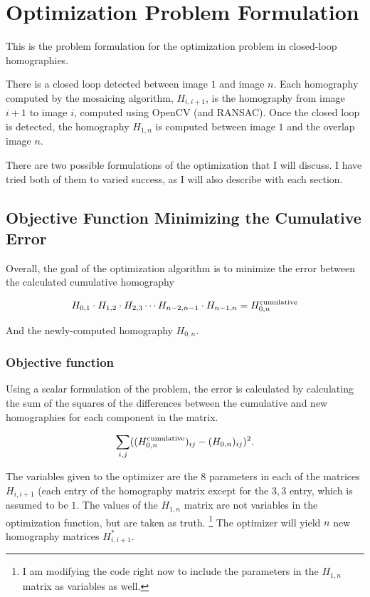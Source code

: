 \documentclass{article}
\begin{document}
\section{Optimization Problem Formulation}

This is the problem formulation for the optimization problem in closed-loop
homographies.

There is a closed loop detected between image $1$ and image $n$. Each
homography computed by the mosaicing algorithm, $H_{i, i + 1}$, is the
homography from image $i + 1$ to image $i$, computed using OpenCV (and
RANSAC). Once the closed loop is detected, the homography $H_{1, n}$ is
computed between image $1$ and the overlap image $n$. 

There are two possible formulations of the optimization that I will discuss. I
have tried both of them to varied success, as I will also describe with each
section. 

\subsection{Objective Function Minimizing the Cumulative Error}

Overall, the goal of the optimization algorithm is to minimize the error
between the calculated cumulative homography

\[H_{0, 1} \cdot H_{1, 2} \cdot H_{2, 3} \cdots H_{n - 2, n - 1} \cdot H_{n - 1, n} = H_{0, n}^{\textnormal{cumulative}}\]

And the newly-computed homography $H_{0, n}$. 

\subsubsection{Objective function}

Using a scalar formulation of the problem, the error is calculated by
calculating the sum of the squares of the differences between the
cumulative and new homographies for each component in the matrix.

\[\sum_{i,j} ((H_{0, n}^{\textnormal{cumulative}})_{ij} - (H_{0, n})_{ij})^2.\]

The variables given to the optimizer are the $8$ parameters in each of the
matrices $H_{i, i + 1}$ (each entry of the homography matrix except for the $3,
3$ entry, which is assumed to be $1$. The values of the $H_{1, n}$ matrix are
not variables in the optimization function, but are taken as truth.
\footnote{I am modifying the code right now to include the parameters in the $H_{1, n}$ matrix as variables as well. } The optimizer will yield
$n$ new homography matrices $H_{i, i+1}^{*}$. 
\end{document}
